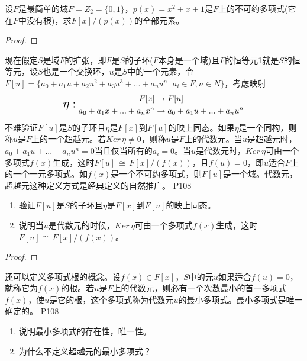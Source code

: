 \begin{example}
	设$F$是最简单的域$F=Z_{2}=\{0,1\}$，$p(x)=x^{2}+x+1$是$F$上的不可约多项式(它在$F$中没有根)，求$F[x]/(p(x))$的全部元素。
\end{example}
\begin{proof}
	
\end{proof}

\original
{
	现在假定$S$是域$F$的扩张，即$F$是$S$的子环($F$本身是一个域)且$F$的恒等元1就是$S$的恒等元，设$S$也是一个交换环，$u$是$S$中的一个元素，令$F[u]=\{a_{0}+a_{1}u+a_{2}u^{2}+a_{3}u^{3}+...+a_{n}u^{n}\,\big| \, a_{i}\in F,n\in N\}$，考虑映射
	\begin{equation*}
		\text{\Large $\eta:$}\,\,
		\begin{aligned}
			F[x]&\rightarrow F[u]\\
			a_{0}+a_{1}x+...+a_{n}x^{n}&\rightarrow a_{0}+a_{1}u+...+a_{n}u^{n}
		\end{aligned}
	\end{equation*}
不难验证$F[u]$是$S$的子环且$\eta$是$F[x]$到$F[u]$的映上同态。如果$\eta$是一个同构，则称$u$是$F$上的一个超越元。若$Ker \, \eta \neq 0$，则称$u$是$F$上的代数元。当$u$是超越元时，$a_{0}+a_{1}u+...+a_{n}u^{n}=0$当且仅当所有的$a_{i}=0$。当$u$是代数元时，$Ker \, \eta$可由一个多项式$f(x)$生成，这时$F[u]\,\cong\, F[x]/(f(x))$，且$f(u)=0$，即$u$适合$F$上的一个一元多项式。如$f(x)$是一个不可约多项式，则$F[u]$是一个域。代数元，超越元这种定义方式是经典定义的自然推广。
}{P108}
\begin{proposition}
	\begin{enumerate}
		\item 验证$F[u]$是$S$的子环且$\eta$是$F[x]$到$F[u]$的映上同态。
		\item 说明当$u$是代数元的时候，$Ker\, \eta$可由一个多项式$f(x)$生成，这时$F[u]\cong \, F[x]/(f(x))$。
	\end{enumerate}
\end{proposition}
\begin{proof}
	
\end{proof}

\original
{
	还可以定义多项式根的概念。设$f(x)\in F[x]$，$S$中的元$u$如果适合$f(u)=0$，就称它为$f(x)$的根。若$u$是$F$上的代数元，则必有一个次数最小的首一多项式$f(x)$，使$u$是它的根，这个多项式称为代数元$u$的最小多项式。最小多项式是唯一确定的。
}
{P108}

\begin{proposition}
	\begin{enumerate}
		\item 说明最小多项式的存在性，唯一性。
		\item 为什么不定义超越元的最小多项式？
	\end{enumerate}
\end{proposition}

